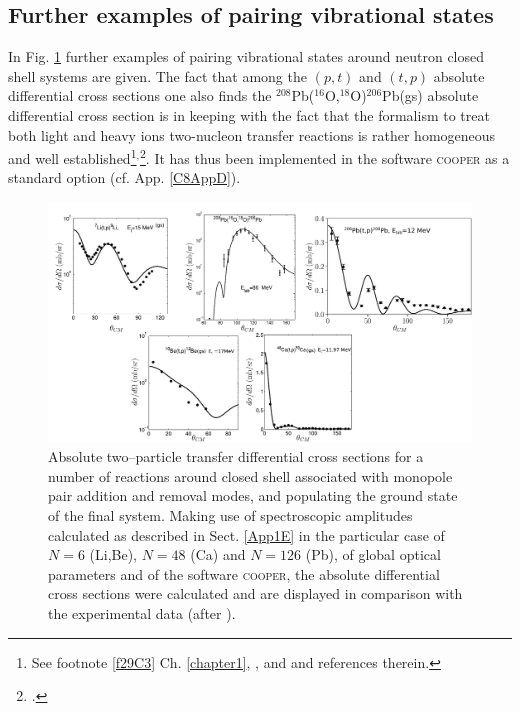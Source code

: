  \subsection{Further examples of pairing vibrational states}\label{C6S1.2}
 In Fig. \ref{fig8_2_1} further examples of pairing vibrational states around  neutron closed shell systems are given. The fact that among the $(p,t)$ and $(t,p)$ absolute differential cross sections one also finds the $^{208}$Pb($^{16}$O,$^{18}$O)$^{206}$Pb(gs) absolute differential cross section is in keeping with the fact that the formalism to treat both light and heavy ions two-nucleon transfer reactions is rather homogeneous and well established\footnote{See footnote \ref{f29C3}  Ch. \ref{chapter1}, \cite{Bayman:82}, \cite{Broglia:04a}  and  \cite{Thompson:88} and references therein.}$^,$\footnote{\cite{Potel:13,Potel:13b}.}.  It has thus been implemented in the software \textsc{cooper} as a standard option (cf. App. \ref{C8AppD}). 
 \begin{figure}
 	\centerline{\includegraphics*[width=18cm,angle=0]{C8/figsC8/fig8_1_5}}
 	\caption{Absolute two--particle transfer differential cross sections for a number of reactions around closed shell associated with monopole pair addition and removal modes, and populating the ground state of the final system. Making use of spectroscopic amplitudes calculated as described in Sect. \ref{App1E} in the particular case of $N=6$ (Li,Be), $N=48$ (Ca) and  $N=126$ (Pb), of global optical parameters and of the software \textsc{cooper}, the absolute differential cross sections were calculated and are displayed in comparison with the experimental data (after \cite{Potel:13}).   
 	 }\label{fig8_2_1}
 \end{figure}
 


